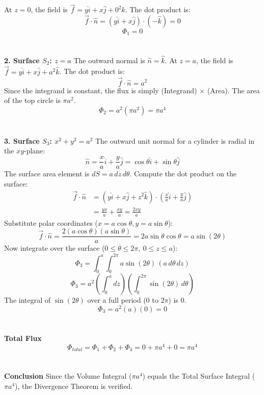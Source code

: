 \documentclass{article}
\begin{document}
At $z=0$, the field is $\vec{f} = y\hat{i} + x\hat{j} + 0^2\hat{k}$.
The dot product is:
\[ \vec{f} \cdot \hat{n} = (y\hat{i} + x\hat{j}) \cdot (-\hat{k}) = 0 \]
\[ \Phi_1 = 0 \]
\\
\\
\textbf{2. Surface $S_2$: $z=a$}
The outward normal is $\hat{n} = \hat{k}$.
At $z=a$, the field is $\vec{f} = y\hat{i} + x\hat{j} + a^2\hat{k}$.
The dot product is:
\[ \vec{f} \cdot \hat{n} = a^2 \]
Since the integrand is constant, the flux is simply (Integrand) $\times$ (Area).
The area of the top circle is $\pi a^2$.
\[ \Phi_2 = a^2 (\pi a^2) = \pi a^4 \]
\\
\\
\textbf{3. Surface $S_3$: $x^2 + y^2 = a^2$}
The outward unit normal for a cylinder is radial in the $xy$-plane:
\[
	\hat{n} = \frac{x}{a}\hat{i} + \frac{y}{a}\hat{j} = \cos\theta\hat{i} + \sin\theta\hat{j}
\]
The surface area element is $dS = a \, dz \, d\theta$.
Compute the dot product on the surface:
\begin{align*}
	\vec{f} \cdot \hat{n} & = (y\hat{i} + x\hat{j} + z^2\hat{k}) \cdot \left(\frac{x}{a}\hat{i} + \frac{y}{a}\hat{j}\right) \\
	                      & = \frac{yx}{a} + \frac{xy}{a} = \frac{2xy}{a}
\end{align*}
Substitute polar coordinates ($x=a\cos\theta, y=a\sin\theta$):
\[
	\vec{f} \cdot \hat{n} = \frac{2(a\cos\theta)(a\sin\theta)}{a} = 2a\sin\theta\cos\theta = a\sin(2\theta)
\]
Now integrate over the surface ($0 \le \theta \le 2\pi, \ 0 \le z \le a$):
\[
	\Phi_3 = \int_0^a \int_0^{2\pi} a\sin(2\theta) \, (a \, d\theta \, dz)
\]
\[
	\Phi_3 = a^2 \left( \int_0^a dz \right) \left( \int_0^{2\pi} \sin(2\theta) \, d\theta \right)
\]
The integral of $\sin(2\theta)$ over a full period ($0$ to $2\pi$) is 0.
\[
	\Phi_3 = a^2 (a) (0) = 0
\]
\\
\\
\textbf{Total Flux}
\[
	\Phi_{total} = \Phi_1 + \Phi_2 + \Phi_3 = 0 + \pi a^4 + 0 = \pi a^4
\]
\\
\\
\textbf{Conclusion}
Since the Volume Integral ($\pi a^4$) equals the Total Surface Integral
($\pi a^4$), the Divergence Theorem is verified.

\pagebreak
\end{document}
